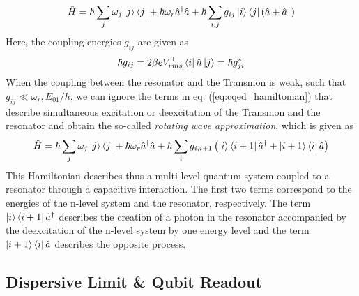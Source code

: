 %
\begin{equation}
\hat{H} = \hbar \sum\limits_j \omega_j \left| j \right>\left< j \right| + \hbar \omega_r \hat{a}^\dagger \hat{a} + \hbar \sum\limits_{i,j} g_{ij} \left| i \right>\left< j \right|(\hat{a}+\hat{a}^\dagger) \label{eq:cqed_hamiltonian}
\end{equation}
%
Here, the coupling energies $g_{ij}$ are given as
%
\begin{equation}
\hbar g_{ij} = 2\beta e V_{rms}^0 \left< i \right|\hat{n}\left| j \right> = \hbar g_{ji}^*
\end{equation}
%
When the coupling between the resonator and the Transmon is weak, such that $g_{ij} \ll \omega_r,E_{01}/h$, we can ignore the terms in eq. (\ref{eq:cqed_hamiltonian}) that describe simultaneous excitation or deexcitation of the Transmon and the resonator and obtain the so-called {\it rotating wave approximation}, which is given as
%
\begin{equation}
\hat{H} = \hbar \sum\limits_j \omega_j \left| j \right>\left< j \right|+\hbar \omega_r \hat{a}^\dagger \hat{a} + \hbar \sum\limits_i g_{i,i+1}\left(\left| i \right>\left< i+1 \right|\hat{a}^\dagger +\left| i+1 \right>\left< i \right|\hat{a}\right) \label{eq:cqed_rotating_wave}
\end{equation}
%
This Hamiltonian describes thus a multi-level quantum system coupled to a resonator through a capacitive interaction. The first two terms correspond to the energies of the n-level system and the resonator, respectively. The term $\left| i \right>\left< i+1 \right|\hat{a}^\dagger$ describes the creation of a photon in the resonator accompanied by the deexcitation of the n-level system by one energy level and the term $\left| i+1 \right>\left< i \right|\hat{a}$ describes the opposite process.

\subsection{Dispersive Limit \& Qubit Readout}

